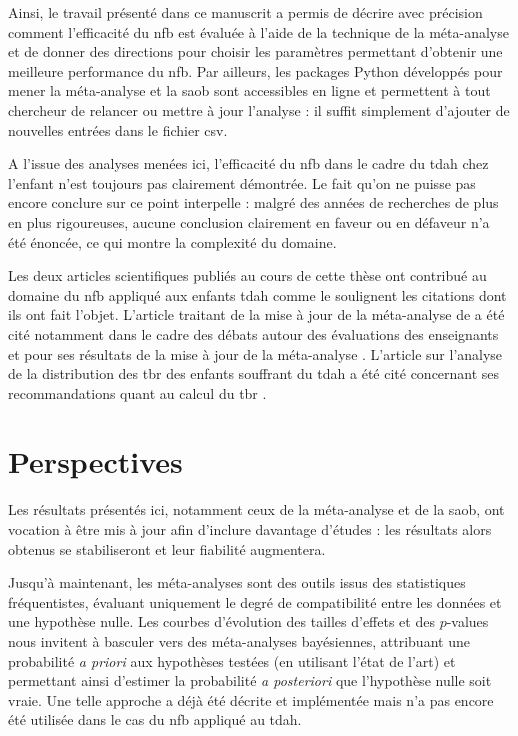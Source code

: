 Ainsi, le travail présenté dans ce manuscrit a permis de décrire avec précision comment l'efficacité du \gls{nfb} est évaluée à l'aide de 
la technique de la méta-analyse et de donner des 
directions pour choisir les paramètres permettant d'obtenir une meilleure performance du \gls{nfb}. Par ailleurs, les packages Python développés pour mener 
la méta-analyse et la \gls{saob}
sont accessibles en ligne et permettent à tout chercheur de relancer ou mettre à jour l'analyse : il suffit simplement d'ajouter de nouvelles 
entrées dans le fichier \gls{csv}.

A l'issue des analyses menées ici, l'efficacité du \gls{nfb} dans le cadre du \gls{tdah} chez l'enfant n'est toujours pas clairement démontrée. 
Le fait qu'on ne puisse pas encore conclure sur ce point interpelle : malgré des années de recherches de plus en plus rigoureuses, aucune conclusion
clairement en faveur ou en défaveur n'a été énoncée, ce qui montre la complexité du domaine.   

Les deux articles scientifiques publiés au cours de cette thèse ont contribué au domaine du \gls{nfb} appliqué aux enfants \gls{tdah}
comme le soulignent les citations dont ils ont fait l'objet. L'article traitant de la mise à jour de la méta-analyse de \citet{Cortese2016} 
\citep{Bussalb2019clinical} a été cité notamment dans le cadre des débats autour des évaluations des enseignants \citep{Bottinger2020} et pour ses résultats
de la mise à jour de la méta-analyse \citep{Bluschke2020}. L'article sur l'analyse de la distribution des \gls{tbr} des enfants souffrant du \gls{tdah} 
\citep{Bussalb2019clinical}
a été cité concernant ses recommandations quant au calcul du \gls{tbr} \citep{Bioulac2020}. 

\section{Perspectives}

Les résultats présentés ici, notamment ceux de la méta-analyse et de la \gls{saob}, ont vocation à être mis à jour afin d'inclure davantage 
d'études : les résultats alors obtenus se stabiliseront et leur fiabilité augmentera.   

Jusqu'à maintenant, les méta-analyses sont des outils issus des statistiques fréquentistes,
évaluant uniquement le degré de compatibilité entre les données et une hypothèse nulle.
Les courbes d'évolution des tailles d'effets et des $p$-values nous invitent à basculer vers des méta-analyses bayésiennes,
attribuant une probabilité \textit{a priori} aux hypothèses testées (en utilisant l'état de l'art) et permettant ainsi d'estimer 
la probabilité \textit{a posteriori} que l'hypothèse nulle soit vraie.
Une telle approche a déjà été décrite et implémentée \citep{Dormuth2016, Spiegelhalter2004} mais n'a pas encore été 
utilisée dans le cas du \gls{nfb} appliqué au \gls{tdah}.  

